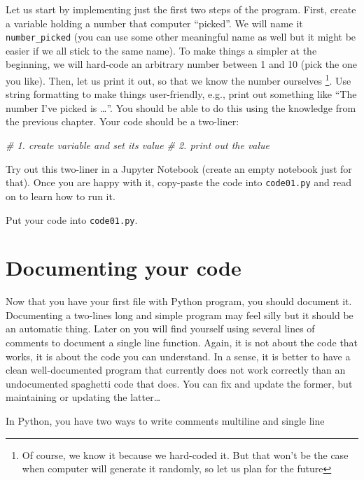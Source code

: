 \documentclass[
]{book}
\newenvironment{Shaded}{\begin{snugshade}}{\end{snugshade}}
\newcommand{\CommentTok}[1]{\textcolor[rgb]{0.56,0.35,0.01}{\textit{#1}}}
\begin{document}
Let us start by implementing just the first two steps of the program. First, create a variable holding a number that computer ``picked''. We will name it \texttt{number\_picked} (you can use some other meaningful name as well but it might be easier if we all stick to the same name). To make things a simpler at the beginning, we will hard-code an arbitrary number between 1 and 10 (pick the one you like). Then, let us print it out, so that we know the number ourselves \footnote{Of course, we know it because we hard-coded it. But that won't be the case when computer will generate it randomly, so let us plan for the future}. Use string formatting to make things user-friendly, e.g., print out something like ``The number I've picked is \ldots{}''. You should be able to do this using the knowledge from the previous chapter. Your code should be a two-liner:

\begin{Shaded}
\begin{Highlighting}[]
\CommentTok{\# 1. create variable and set its value}
\CommentTok{\# 2. print out the value}
\end{Highlighting}
\end{Shaded}

Try out this two-liner in a Jupyter Notebook (create an empty notebook just for that). Once you are happy with it, copy-paste the code into \texttt{code01.py} and read on to learn how to run it.

Put your code into \texttt{code01.py}.

\hypertarget{documenting-your-code}{%
\section{Documenting your code}\label{documenting-your-code}}

Now that you have your first file with Python program, you should document it. Documenting a two-lines long and simple program may feel silly but it should be an automatic thing. Later on you will find yourself using several lines of comments to document a single line function. Again, it is not about the code that works, it is about the code you can understand. In a sense, it is better to have a clean well-documented program that currently does not work correctly than an undocumented spaghetti code that does. You can fix and update the former, but maintaining or updating the latter\ldots{}

In Python, you have two ways to write comments multiline and single line
\end{document}
